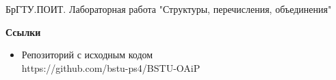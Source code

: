 \begin{thebibliography}{3}
    \bibitem{}
    БрГТУ.ПОИТ. Лабораторная работа "Структуры, перечисления, объединения"
\end{thebibliography}

\textbf{Ссылки}
\begin{itemize}
    \item Репозиторий с исходным кодом\\
    https://github.com/bstu-ps4/BSTU-OAiP
\end{itemize}